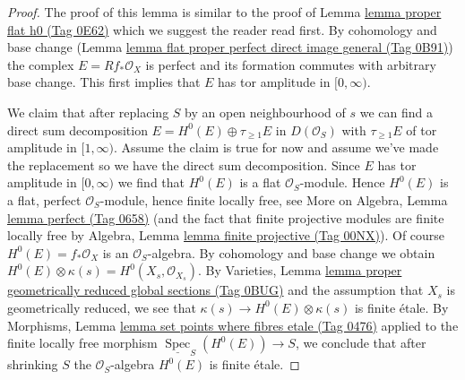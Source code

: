 \documentclass{amsart}
\theoremstyle{plain}
\theoremstyle{definition}
\theoremstyle{remark}
\numberwithin{equation}{subsection}
\def\Spec{\mathop{\mathrm{Spec}}}
\begin{document}
\begin{proof}
The proof of this lemma is similar to the proof of
Lemma \href{https://stacks.math.columbia.edu/tag/0E62}{lemma proper flat h0 (Tag 0E62)}
which we suggest the reader read first.
By cohomology and base change
(Lemma \href{https://stacks.math.columbia.edu/tag/0B91}{lemma flat proper perfect direct image general (Tag 0B91)})
the complex $E = Rf_*\mathcal{O}_X$
is perfect and its formation commutes with arbitrary base change.
This first implies that $E$ has tor amplitude in $[0, \infty)$.

\medskip\noindent
We claim that after replacing $S$ by an open neighbourhood of
$s$ we can find a direct sum decomposition
$E = H^0(E) \oplus \tau_{\geq 1}E$ in $D(\mathcal{O}_S)$
with $\tau_{\geq 1}E$ of tor amplitude in $[1, \infty)$.
Assume the claim is true for now and assume we've made the replacement
so we have the direct sum decomposition.
Since $E$ has tor amplitude in $[0, \infty)$ we find that
$H^0(E)$ is a flat $\mathcal{O}_S$-module.
Hence $H^0(E)$ is a flat, perfect $\mathcal{O}_S$-module,
hence finite locally free, see
More on Algebra, Lemma \href{https://stacks.math.columbia.edu/tag/0658}{lemma perfect (Tag 0658)}
(and the fact that finite projective modules are finite locally free by
Algebra, Lemma \href{https://stacks.math.columbia.edu/tag/00NX}{lemma finite projective (Tag 00NX)}).
Of course $H^0(E) = f_*\mathcal{O}_X$ is an $\mathcal{O}_S$-algebra.
By cohomology and base change we obtain
$H^0(E) \otimes \kappa(s) = H^0(X_s, \mathcal{O}_{X_s})$.
By Varieties, Lemma
\href{https://stacks.math.columbia.edu/tag/0BUG}{lemma proper geometrically reduced global sections (Tag 0BUG)}
and the assumption that $X_s$ is geometrically reduced, we
see that $\kappa(s) \to H^0(E) \otimes \kappa(s)$
is finite \'etale. By Morphisms, Lemma
\href{https://stacks.math.columbia.edu/tag/0476}{lemma set points where fibres etale (Tag 0476)}
applied to the finite locally free morphism
$\underline{\Spec}_S(H^0(E)) \to S$,
we conclude that after shrinking $S$ the $\mathcal{O}_S$-algebra
$H^0(E)$ is finite \'etale.


\end{proof}
\end{document}
